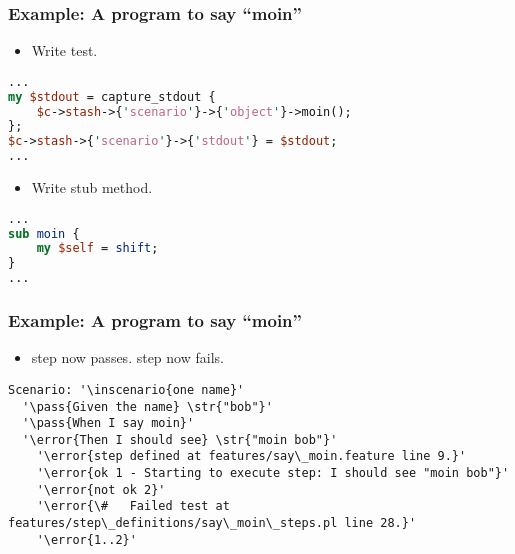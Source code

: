 \documentclass[10pt]{vcs_beamer}
\newcommand{\inscenario}[1]{\color{RoyalBlue}{#1}}
\newcommand{\str}[1]{\color{Turquoise}{#1}}
\newcommand{\error}[1]{\color{red}{#1}}
\newcommand{\pass}[1]{\color{ForestGreen}{#1}}
\begin{document}
\begin{frame}[fragile]
\frametitle{Example: A program to say ``moin''}

\begin{itemize}
    \item Write  test.
\end{itemize}

\begin{lstlisting}[language=perl]
...
my $stdout = capture_stdout {
    $c->stash->{'scenario'}->{'object'}->moin();
};
$c->stash->{'scenario'}->{'stdout'} = $stdout;
...
\end{lstlisting}

\begin{itemize}
    \item Write stub  method.
\end{itemize}

\begin{lstlisting}[language=perl]
...
sub moin {
    my $self = shift;
}
...
\end{lstlisting}

\end{frame}

\begin{frame}[fragile]
\frametitle{Example: A program to say ``moin''}

\begin{itemize}
    \item {} step now passes.   step now fails.
\end{itemize}

\begin{lstlisting}[escapeinside='']
Scenario: '\inscenario{one name}'
  '\pass{Given the name} \str{"bob"}'
  '\pass{When I say moin}'
  '\error{Then I should see} \str{"moin bob"}'
    '\error{step defined at features/say\_moin.feature line 9.}'
    '\error{ok 1 - Starting to execute step: I should see "moin bob"}'
    '\error{not ok 2}'
    '\error{\#   Failed test at features/step\_definitions/say\_moin\_steps.pl line 28.}'
    '\error{1..2}'
\end{lstlisting}

\end{frame}
\end{document}

